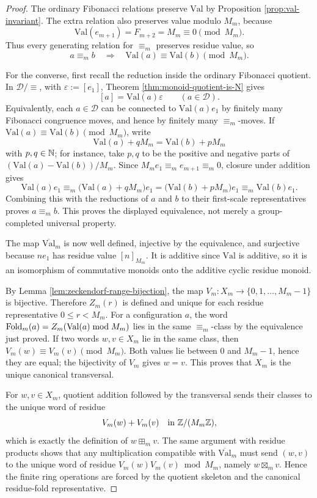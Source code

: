 \begin{proof}
The ordinary Fibonacci relations preserve \(\mathrm{Val}\) by Proposition \ref{prop:val-invariant}. The extra relation also preserves value modulo \(M_m\), because
\[
\mathrm{Val}(e_{m+1})=F_{m+2}=M_m\equiv0\pmod {M_m}.
\]
Thus every generating relation for \(\equiv_m\) preserves residue value, so
\[
a\equiv_m b\quad\Longrightarrow\quad \mathrm{Val}(a)\equiv\mathrm{Val}(b)\pmod {M_m}.
\]

For the converse, first recall the reduction inside the ordinary Fibonacci quotient. In \(\mathcal D/\!\equiv\), with \(\varepsilon:=[e_1]\), Theorem \ref{thm:monoid-quotient-is-N} gives
\[
[a]=\mathrm{Val}(a)\varepsilon
\qquad(a\in\mathcal D).
\]
Equivalently, each \(a\in\mathcal D\) can be connected to \(\mathrm{Val}(a)e_1\) by finitely many Fibonacci congruence moves, and hence by finitely many \(\equiv_m\)-moves. If \(\mathrm{Val}(a)\equiv\mathrm{Val}(b)\pmod {M_m}\), write
\[
\mathrm{Val}(a)+qM_m=\mathrm{Val}(b)+pM_m
\]
with \(p,q\in\mathbb{N}\); for instance, take \(p,q\) to be the positive and negative parts of \((\mathrm{Val}(a)-\mathrm{Val}(b))/M_m\). Since \(M_me_1\equiv_m e_{m+1}\equiv_m0\), closure under addition gives
\[
\mathrm{Val}(a)e_1
\equiv_m \bigl(\mathrm{Val}(a)+qM_m\bigr)e_1
=\bigl(\mathrm{Val}(b)+pM_m\bigr)e_1
\equiv_m \mathrm{Val}(b)e_1.
\]
Combining this with the reductions of \(a\) and \(b\) to their first-scale representatives proves \(a\equiv_m b\). This proves the displayed equivalence, not merely a group-completed universal property.

The map \(\overline{\mathrm{Val}}_m\) is now well defined, injective by the equivalence, and surjective because \(ne_1\) has residue value \([n]_{M_m}\). It is additive since \(\mathrm{Val}\) is additive, so it is an isomorphism of commutative monoids onto the additive cyclic residue monoid.

By Lemma \ref{lem:zeckendorf-range-bijection}, the map \(V_m:X_m\to\{0,1,\dots,M_m-1\}\) is bijective. Therefore \(Z_m(r)\) is defined and unique for each residue representative \(0\le r<M_m\). For a configuration \(a\), the word \(\operatorname{Fold}_m(a)=Z_m(\mathrm{Val}(a)\bmod M_m)\) lies in the same \(\equiv_m\)-class by the equivalence just proved. If two words \(w,v\in X_m\) lie in the same class, then \(V_m(w)\equiv V_m(v)\pmod {M_m}\). Both values lie between \(0\) and \(M_m-1\), hence they are equal; the bijectivity of \(V_m\) gives \(w=v\). This proves that \(X_m\) is the unique canonical transversal.

For \(w,v\in X_m\), quotient addition followed by the transversal sends their classes to the unique word of residue
\[
V_m(w)+V_m(v)
\quad\text{in }\mathbb{Z}/(M_m\mathbb{Z}),
\]
which is exactly the definition of \(w\boxplus_m v\). The same argument with residue products shows that any multiplication compatible with \(\overline{\mathrm{Val}}_m\) must send \((w,v)\) to the unique word of residue \(V_m(w)V_m(v)\bmod M_m\), namely \(w\boxtimes_m v\). Hence the finite ring operations are forced by the quotient skeleton and the canonical residue-fold representative.
\end{proof}

